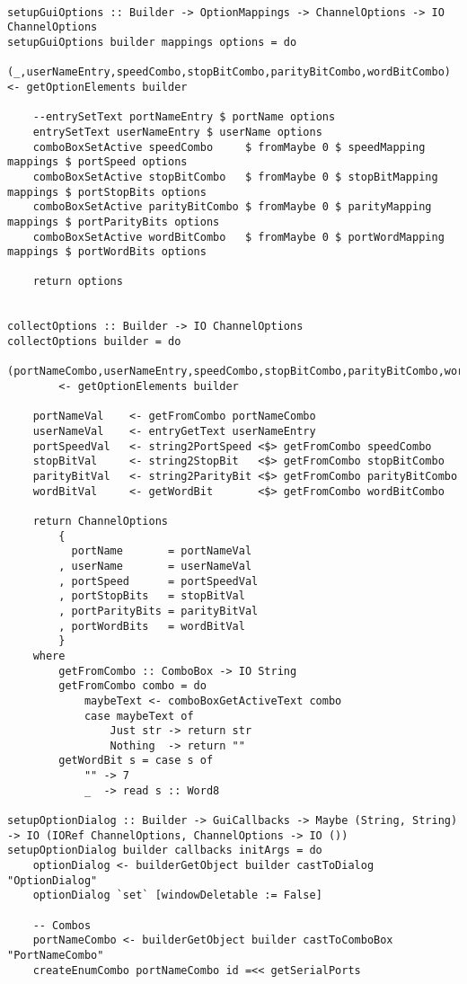 \documentclass[russian,utf8,simple,emptystyle]{eskdtext}
\begin{document}
\begin{lstlisting}
        
setupGuiOptions :: Builder -> OptionMappings -> ChannelOptions -> IO ChannelOptions
setupGuiOptions builder mappings options = do
    (_,userNameEntry,speedCombo,stopBitCombo,parityBitCombo,wordBitCombo) <- getOptionElements builder

    --entrySetText portNameEntry $ portName options
    entrySetText userNameEntry $ userName options
    comboBoxSetActive speedCombo     $ fromMaybe 0 $ speedMapping mappings $ portSpeed options
    comboBoxSetActive stopBitCombo   $ fromMaybe 0 $ stopBitMapping mappings $ portStopBits options
    comboBoxSetActive parityBitCombo $ fromMaybe 0 $ parityMapping mappings $ portParityBits options
    comboBoxSetActive wordBitCombo   $ fromMaybe 0 $ portWordMapping mappings $ portWordBits options

    return options


collectOptions :: Builder -> IO ChannelOptions
collectOptions builder = do 
    (portNameCombo,userNameEntry,speedCombo,stopBitCombo,parityBitCombo,wordBitCombo) 
        <- getOptionElements builder

    portNameVal    <- getFromCombo portNameCombo
    userNameVal    <- entryGetText userNameEntry
    portSpeedVal   <- string2PortSpeed <$> getFromCombo speedCombo
    stopBitVal     <- string2StopBit   <$> getFromCombo stopBitCombo
    parityBitVal   <- string2ParityBit <$> getFromCombo parityBitCombo
    wordBitVal     <- getWordBit       <$> getFromCombo wordBitCombo

    return ChannelOptions
        {
          portName       = portNameVal
        , userName       = userNameVal
        , portSpeed      = portSpeedVal
        , portStopBits   = stopBitVal
        , portParityBits = parityBitVal 
        , portWordBits   = wordBitVal
        }
    where
        getFromCombo :: ComboBox -> IO String
        getFromCombo combo = do 
            maybeText <- comboBoxGetActiveText combo
            case maybeText of
                Just str -> return str
                Nothing  -> return ""
        getWordBit s = case s of 
            "" -> 7
            _  -> read s :: Word8

setupOptionDialog :: Builder -> GuiCallbacks -> Maybe (String, String) -> IO (IORef ChannelOptions, ChannelOptions -> IO ())
setupOptionDialog builder callbacks initArgs = do
    optionDialog <- builderGetObject builder castToDialog "OptionDialog" 
    optionDialog `set` [windowDeletable := False]

    -- Combos
    portNameCombo <- builderGetObject builder castToComboBox "PortNameCombo"
    createEnumCombo portNameCombo id =<< getSerialPorts


\end{lstlisting}
\end{document}
